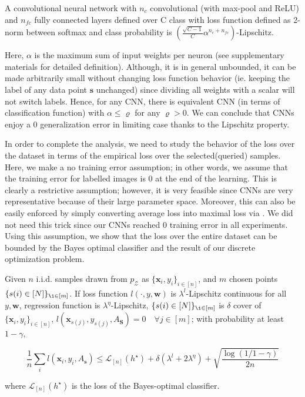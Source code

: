 \begin{lemma}
A convolutional neural network with $n_c$ convolutional (with max-pool and ReLU) and $n_{fc}$ fully connected layers defined over C class with loss function defined as 2-norm between softmax and class probability is $\left(\frac{\sqrt{C-1}}{C} \alpha^{n_c+n_{fc}}\right)$-Lipschitz.
\end{lemma}

Here, $\alpha$ is the maximum sum of  input weights per neuron (see supplementary materials for detailed definition). Although, it is in general unbounded, it can be made arbitrarily small without changing loss function behavior (ie. keeping the label of any data point $\mathbf{s}$ unchanged) since dividing all weights with a scalar will not switch labels. Hence, for any CNN, there is equivalent CNN (in terms of classification function) with $\alpha \leq \varrho$ for any $\varrho > 0$. We can conclude that CNNs enjoy a $0$ generalization error in limiting case thanks to the Lipschitz property.

In order to complete the analysis, we need to study the behavior of the loss over the dataset in terms of the empirical loss over the selected(queried) samples. Here, we make a no training error assumption; in other words, we assume that the training error for labelled images is $0$ at the end of the learning. This is clearly a restrictive assumption; however, it is very feasible since CNNs are very representative because of their large parameter space. Moreover, this can also be easily enforced by simply converting average loss into maximal loss via \cite{maximal_loss}. We did not need this trick since our CNNs reached 0 training error in all experiments. Using this assumption, we show that the loss over the entire dataset can be bounded by the Bayes optimal classifier and the result of our discrete optimization problem.

\begin{theorem}
Given $n$ i.i.d. samples drawn from $p_\mathcal{Z}$ as $\{\mathbf{x}_i,y_i\}_{i\in[n]}$, and $m$ chosen points $\{ s(i) \in [N]\}_{\i \in [m]}$. If loss function $l(\cdot,y,\mathbf{w})$ is $\lambda^l$-Lipschitz continuous for all $y, \mathbf{w}$, regression function is $\lambda^\eta$-Lipschitz, $\{ s(i) \in [N]\}_{\i \in [m]}$ is $\delta$ cover of $\{\mathbf{x}_i,y_i\}_{i\in[n]}$, $l(\mathbf{x}_{s(j)},y_{s(j)},A_\mathbf{S})=0\quad \forall j \in [m]$; with probability at least $1-\gamma$,
\begin{small}
\[
\frac{1}{n}\sum_i l(\mathbf{x}_i,y_i,A_\mathbf{s}) \leq \mathcal{L}_{[n]} (h^\star) +\delta(\lambda^l + 2 \lambda^{\eta}) + 
\sqrt{\frac{\log(1/1-\gamma)}{2n}}
\]
\end{small}
where $\mathcal{L}_{[n]} (h^\star)$ is the loss of the Bayes-optimal classifier.
\label{mainthm2}
\end{theorem}

